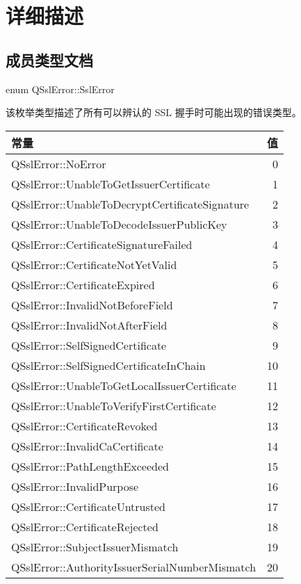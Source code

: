 \section{详细描述}

\subsection{成员类型文档}

enum QSslError::SslError

该枚举类型描述了所有可以辨认的 SSL 握手时可能出现的错误类型。

\begin{longtable}[l]{|l|r|}
\hline 
常量 &	值  \\ 
\hline
QSslError::NoError &	0 \\ 
\hline
QSslError::UnableToGetIssuerCertificate &	1 \\ 
\hline
QSslError::UnableToDecryptCertificateSignature &	2 \\ 
\hline
QSslError::UnableToDecodeIssuerPublicKey &	3 \\ 
\hline
QSslError::CertificateSignatureFailed &	4 \\ 
\hline
QSslError::CertificateNotYetValid &	5 \\ 
\hline
QSslError::CertificateExpired &	6 \\
\hline
QSslError::InvalidNotBeforeField &	7 \\ 
\hline
QSslError::InvalidNotAfterField &	8 \\ 
\hline
QSslError::SelfSignedCertificate 	&9 \\ 
\hline
QSslError::SelfSignedCertificateInChain &	10 \\ 
\hline
QSslError::UnableToGetLocalIssuerCertificate 	&11 \\ 
\hline
QSslError::UnableToVerifyFirstCertificate &	12 \\ 
\hline
QSslError::CertificateRevoked& 	13 \\ 
\hline
QSslError::InvalidCaCertificate &	14 \\ 
\hline
QSslError::PathLengthExceeded &	15 \\ 
\hline
QSslError::InvalidPurpose &	16 \\ 
\hline
QSslError::CertificateUntrusted &	17 \\ 
\hline
QSslError::CertificateRejected &	18 \\ 
\hline
QSslError::SubjectIssuerMismatch &	19 \\ 
\hline
QSslError::AuthorityIssuerSerialNumberMismatch &	20 \\ 

\end{longtable}
